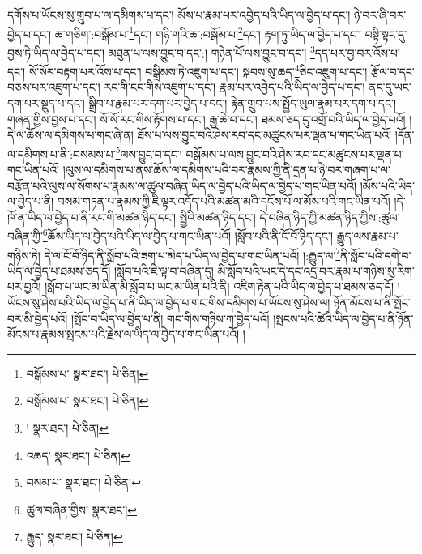དགོས་པ་ཡོངས་སུ་གྲུབ་པ་ལ་དམིགས་པ་དང་། མོས་པ་རྣམ་པར་འབྱེད་པའི་ཡིད་ལ་བྱེད་པ་དང་། ཉེ་བར་ཞི་བར་བྱེད་པ་དང་། ཆ་གཅིག་:བསྒོམ་པ་\footnote{བསྒོམས་པ་  སྣར་ཐང་།  པེ་ཅིན། }དང་། གཉི་གའི་ཆ་:བསྒོམ་པ་\footnote{བསྒོམས་པ་  སྣར་ཐང་།  པེ་ཅིན། }དང་། རྟག་ཏུ་ཡིད་ལ་བྱེད་པ་དང་། བསྟི་སྟང་དུ་བྱས་ཏེ་ཡིད་ལ་བྱེད་པ་དང་། མཐུན་པ་ལས་བྱུང་བ་དང་:། གཉེན་པོ་ལས་བྱུང་བ་དང་། \footnote{།    སྣར་ཐང་།  པེ་ཅིན། }དད་པར་བྱ་བར་འོས་པ་དང་། སོ་སོར་བརྟག་པར་འོས་པ་དང་། བསྒྲིམས་ཏེ་འཇུག་པ་དང་། སྐབས་སུ་ཆད་\footnote{འཆད་  སྣར་ཐང་།  པེ་ཅིན། }ཅིང་འཇུག་པ་དང་། རྩོལ་བ་དང་བཅས་པར་འཇུག་པ་དང་། རང་གི་ངང་གིས་འཇུག་པ་དང་། རྣམ་པར་འབྱེད་པའི་ཡིད་ལ་བྱེད་པ་དང་། ནང་དུ་ཡང་དག་པར་སྡུད་པ་དང་། སྒྲིབ་པ་རྣམ་པར་དག་པར་བྱེད་པ་དང་། རྟེན་གྲུབ་པས་སྤྱོད་ཡུལ་རྣམ་པར་དག་པ་དང་། གཞན་གྱིས་བྱས་པ་དང་། སོ་སོ་རང་གིས་རྟོགས་པ་དང་། རྒྱ་ཆེ་བ་དང་། ཐམས་ཅད་དུ་འགྲོ་བའི་ཡིད་ལ་བྱེད་པའོ། །དེ་ལ་ཆོས་ལ་དམིགས་པ་གང་ཞེ་ན། ཐོས་པ་ལས་བྱུང་བའི་ཤེས་རབ་དང་མཚུངས་པར་ལྡན་པ་གང་ཡིན་པའོ། །དོན་ལ་དམིགས་པ་ནི་:བསམས་པ་\footnote{བསམ་པ་  སྣར་ཐང་།  པེ་ཅིན། }ལས་བྱུང་བ་དང་། བསྒོམས་པ་ལས་བྱུང་བའི་ཤེས་རབ་དང་མཚུངས་པར་ལྡན་པ་གང་ཡིན་པའོ། །ལུས་ལ་དམིགས་པ་ནས་ཆོས་ལ་དམིགས་པའི་བར་རྣམས་ཀྱི་ནི་དྲན་པ་ཉེ་བར་གཞག་པ་ལ་བརྩོན་པའི་ལུས་ལ་སོགས་པ་རྣམས་ལ་ཚུལ་བཞིན་ཡིད་ལ་བྱེད་པའི་ཡིད་ལ་བྱེད་པ་གང་ཡིན་པའོ། །མོས་པའི་ཡིད་ལ་བྱེད་པ་ནི། བསམ་གཏན་པ་རྣམས་ཀྱི་ཇི་ལྟར་འདོད་པའི་མཚན་མའི་དངོས་པོ་ལ་མོས་པའི་གང་ཡིན་པའོ། །དེ་ཁོ་ན་ཡིད་ལ་བྱེད་པ་ནི་རང་གི་མཚན་ཉིད་དང་། སྤྱིའི་མཚན་ཉིད་དང་། དེ་བཞིན་ཉིད་ཀྱི་མཚན་ཉིད་ཀྱིས་:ཚུལ་བཞིན་ཀྱི་\footnote{ཚུལ་བཞིན་གྱིས་  སྣར་ཐང་། }ཆོས་ཡིད་ལ་བྱེད་པའི་ཡིད་ལ་བྱེད་པ་གང་ཡིན་པའོ། །སློབ་པའི་ནི་ངོ་བོ་ཉིད་དང་། རྒྱུད་ལས་རྣམ་པ་གཉིས་ཏེ། དེ་ལ་ངོ་བོ་ཉིད་ནི་སློབ་པའི་ཟག་པ་མེད་པ་ཡིད་ལ་བྱེད་པ་གང་ཡིན་པའོ། །:རྒྱུད་ལ་\footnote{རྒྱུད་  སྣར་ཐང་།  པེ་ཅིན། }ནི་སློབ་པའི་དགེ་བ་ཡིད་ལ་བྱེད་པ་ཐམས་ཅད་དོ། །སློབ་པའི་ཇི་ལྟ་བ་བཞིན་དུ། མི་སློབ་པའི་ཡང་དེ་དང་འདྲ་བར་རྣམ་པ་གཉིས་སུ་རིག་པར་བྱའོ། །སློབ་པ་ཡང་མ་ཡིན་མི་སློབ་པ་ཡང་མ་ཡིན་པའི་ནི། འཇིག་རྟེན་པའི་ཡིད་ལ་བྱེད་པ་ཐམས་ཅད་དོ། །ཡོངས་སུ་ཤེས་པའི་ཡིད་ལ་བྱེད་པ་ནི་ཡིད་ལ་བྱེད་པ་གང་གིས་དམིགས་པ་ཡོངས་སུ་ཤེས་ལ། ཉོན་མོངས་པ་ནི་སྤོང་བར་མི་བྱེད་པའོ། །སྤོང་བ་ཡིད་ལ་བྱེད་པ་ནི། གང་གིས་གཉིས་ཀ་བྱེད་པའོ། །སྤངས་པའི་ཚེའི་ཡིད་ལ་བྱེད་པ་ནི་ཉོན་མོངས་པ་རྣམས་སྤངས་པའི་རྗེས་ལ་ཡིད་ལ་བྱེད་པ་གང་ཡིན་པའོ། །
